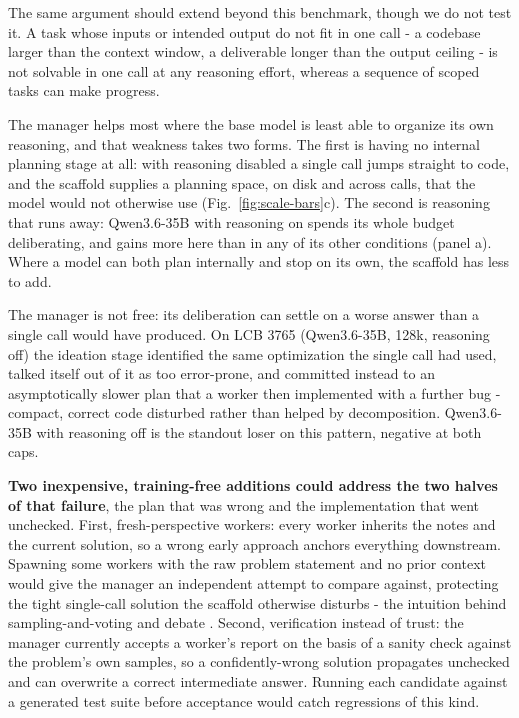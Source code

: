 \documentclass{article}
\begin{document}
The same argument should extend beyond this benchmark, though we do not test it. A task whose
inputs or intended output do not fit in one call - a codebase larger than the context window,
a deliverable longer than the output ceiling - is not solvable in one call at any reasoning
effort, whereas a sequence of scoped tasks can make progress.

The manager helps most where the base model is least able to organize its own reasoning, and
that weakness takes two forms. The first is having no internal planning stage at all: with
reasoning disabled a single call jumps straight to code, and the scaffold supplies a planning
space, on disk and across calls, that the model would not otherwise use
(Fig.~\ref{fig:scale-bars}c). The second is reasoning that runs away: Qwen3.6-35B with
reasoning on spends its whole budget deliberating, and gains more here than in any of its other
conditions (panel a). Where a model can both plan internally and stop on
its own, the scaffold has less to add.

The manager is not free: its deliberation can settle on a worse answer than a single call would
have produced. On LCB 3765 (Qwen3.6-35B, 128k, reasoning off) the ideation stage identified the
same optimization the single call had used, talked itself out of it as too error-prone, and
committed instead to an asymptotically slower plan that a worker then implemented with a further
bug - compact, correct code disturbed rather than helped by decomposition. Qwen3.6-35B with
reasoning off is the standout loser on this pattern, negative at both caps.

\textbf{Two inexpensive, training-free additions could address the two halves of that failure},
the plan that was wrong and the implementation that went unchecked. First,
fresh-perspective workers: every worker inherits the notes and the current solution, so a
wrong early approach anchors everything downstream. Spawning some workers with the raw problem
statement and no prior context would give the manager an independent attempt to compare against,
protecting the tight single-call solution the scaffold otherwise disturbs - the intuition
behind sampling-and-voting and debate \citep{li2024,du2023}. Second, verification instead
of trust: the manager currently accepts a worker's report on the basis of a sanity check against
the problem's own samples, so a confidently-wrong solution propagates unchecked and can overwrite
a correct intermediate answer. Running each candidate against a generated test suite before
acceptance would catch regressions of this kind.
\end{document}
